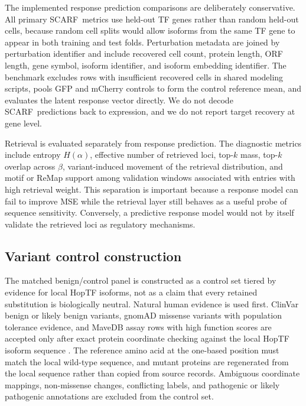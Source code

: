 \documentclass{article}
\newcommand{\scarf}{\textsc{SCARF}}
\begin{document}
The implemented response prediction comparisons are deliberately conservative. All primary \scarf\ metrics use held-out TF genes rather than random held-out cells, because random cell splits would allow isoforms from the same TF gene to appear in both training and test folds. Perturbation metadata are joined by perturbation identifier and include recovered cell count, protein length, ORF length, gene symbol, isoform identifier, and isoform embedding identifier. The benchmark excludes rows with insufficient recovered cells in shared modeling scripts, pools GFP and mCherry controls to form the control reference mean, and evaluates the latent response vector directly. We do not decode \scarf\ predictions back to expression, and we do not report target recovery at gene level.

Retrieval is evaluated separately from response prediction. The diagnostic metrics include entropy \(H(\alpha)\), effective number of retrieved loci, top-\(k\) mass, top-\(k\) overlap across \(\beta\), variant-induced movement of the retrieval distribution, and motif or ReMap support among validation windows associated with entries with high retrieval weight. This separation is important because a response model can fail to improve MSE while the retrieval layer still behaves as a useful probe of sequence sensitivity. Conversely, a predictive response model would not by itself validate the retrieved loci as regulatory mechanisms.

\subsection{Variant control construction}

The matched benign/control panel is constructed as a control set tiered by evidence for local HopTF isoforms, not as a claim that every retained substitution is biologically neutral. Natural human evidence is used first. ClinVar benign or likely benign variants, gnomAD missense variants with population tolerance evidence, and MaveDB assay rows with high function scores are accepted only after exact protein coordinate checking against the local HopTF isoform sequence \citep{landrum2025clinvar,karczewski2020gnomad,esposito2019mavedb}. The reference amino acid at the one-based position must match the local wild-type sequence, and mutant proteins are regenerated from the local sequence rather than copied from source records. Ambiguous coordinate mappings, non-missense changes, conflicting labels, and pathogenic or likely pathogenic annotations are excluded from the control set.
\end{document}
